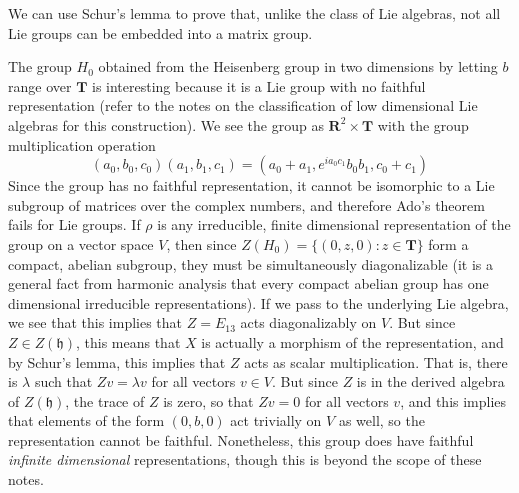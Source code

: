 We can use Schur's lemma to prove that, unlike the class of Lie algebras, not all Lie groups can be embedded into a matrix group.

\begin{example}
    The group $H_0$ obtained from the Heisenberg group in two dimensions by letting $b$ range over $\mathbf{T}$ is interesting because it is a Lie group with no faithful representation (refer to the notes on the classification of low dimensional Lie algebras for this construction). We see the group as $\mathbf{R}^2 \times \mathbf{T}$ with the group multiplication operation
    \[ (a_0,b_0,c_0)(a_1,b_1,c_1) = (a_0 + a_1, e^{ia_0c_1}b_0b_1, c_0 + c_1) \]
    Since the group has no faithful representation, it cannot be isomorphic to a Lie subgroup of matrices over the complex numbers, and therefore Ado's theorem fails for Lie groups. If $\rho$ is any irreducible, finite dimensional representation of the group on a vector space $V$, then since $Z(H_0) = \{ (0,z,0): z \in \mathbf{T} \}$ form a compact, abelian subgroup, they must be simultaneously diagonalizable (it is a general fact from harmonic analysis that every compact abelian group has one dimensional irreducible representations). If we pass to the underlying Lie algebra, we see that this implies that $Z = E_{13}$ acts diagonalizably on $V$. But since $Z \in Z(\mathfrak{h})$, this means that $X$ is actually a morphism of the representation, and by Schur's lemma, this implies that $Z$ acts as scalar multiplication. That is, there is $\lambda$ such that $Zv = \lambda v$ for all vectors $v \in V$. But since $Z$ is in the derived algebra of $Z(\mathfrak{h})$, the trace of $Z$ is zero, so that $Zv = 0$ for all vectors $v$, and this implies that elements of the form $(0,b,0)$ act trivially on $V$ as well, so the representation cannot be faithful. Nonetheless, this group does have faithful {\it infinite dimensional} representations, though this is beyond the scope of these notes.


\end{example}
